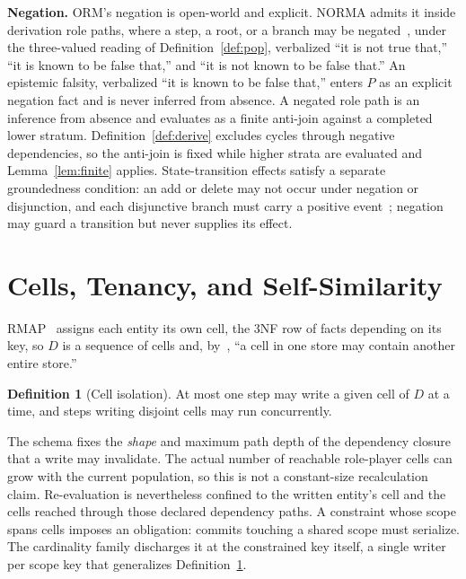 \documentclass[10pt,twocolumn]{article}
\theoremstyle{plain}
\theoremstyle{definition}
\newtheorem{definition}{Definition}
\begin{document}
\smallskip\noindent\textbf{Negation.} ORM's negation is open-world and explicit. NORMA admits it inside derivation role paths, where a step, a root, or a branch may be negated~\cite{norma}, under the three-valued reading of Definition~\ref{def:pop}, verbalized ``it is not true that,'' ``it is known to be false that,'' and ``it is not known to be false that.'' An epistemic falsity, verbalized ``it is known to be false that,'' enters $P$ as an explicit negation fact and is never inferred from absence. A negated role path is an inference from absence and evaluates as a finite anti-join against a completed lower stratum. Definition~\ref{def:derive} excludes cycles through negative dependencies, so the anti-join is fixed while higher strata are evaluated and Lemma~\ref{lem:finite} applies. State-transition effects satisfy a separate groundedness condition: an add or delete may not occur under negation or disjunction, and each disjunctive branch must carry a positive event~\cite{norma}; negation may guard a transition but never supplies its effect.


\section{Cells, Tenancy, and Self-Similarity}\label{sec:cells}

RMAP~\cite{halpin08} assigns each entity its own cell, the 3NF row of facts depending on its key, so $D$ is a sequence of cells and, by~\cite[Sec.\,14.7]{backus78}, ``a cell in one store may contain another entire store.''

\begin{definition}[Cell isolation]\label{def:iso}
At most one step may write a given cell of $D$ at a time, and steps writing disjoint cells may run concurrently.
\end{definition}

\noindent The schema fixes the \emph{shape} and maximum path depth of the dependency closure that a write may invalidate. The actual number of reachable role-player cells can grow with the current population, so this is not a constant-size recalculation claim. Re-evaluation is nevertheless confined to the written entity's cell and the cells reached through those declared dependency paths. A constraint whose scope spans cells imposes an obligation: commits touching a shared scope must serialize. The cardinality family discharges it at the constrained key itself, a single writer per scope key that generalizes Definition~\ref{def:iso}.
\end{document}
